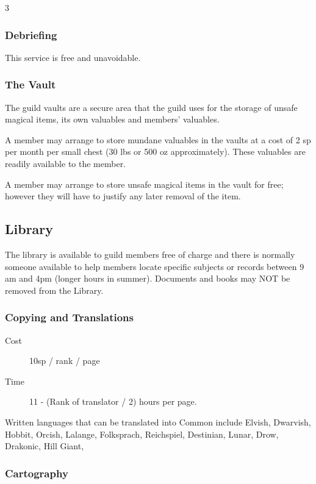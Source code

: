 \begin{multicols}{3}
\subsubsection{Debriefing}

This service is free and unavoidable.

\subsubsection{The Vault}

The guild vaults are a secure area that the guild uses for the storage
of unsafe magical items, its own valuables and members’ valuables.

A member may arrange to store mundane valuables in the vaults at a
cost of 2 sp per month per small chest (30 lbs or 500 oz
approximately).  These valuables are readily available to the member.

A member may arrange to store unsafe magical items in the vault for
free; however they will have to justify any later removal of the item.

\subsection{Library}

The library is available to guild members free of charge and there is
normally someone available to help members locate specific subjects or
records between 9 am and 4pm (longer hours in summer). Documents and
books may NOT be removed from the Library.

\subsubsection{Copying and Translations}

\begin{description}
\item[Cost] 10sp / rank / page
\item[Time] 11 - (Rank of translator / 2) hours per
page.
\end{description}

Written languages that can be translated into Common include Elvish,
Dwarvish, Hobbit, Orcish, Lalange, Folksprach, Reichspiel, Destinian,
Lunar, Drow, Drakonic, Hill Giant,

\subsubsection{Cartography}


\end{multicols}
